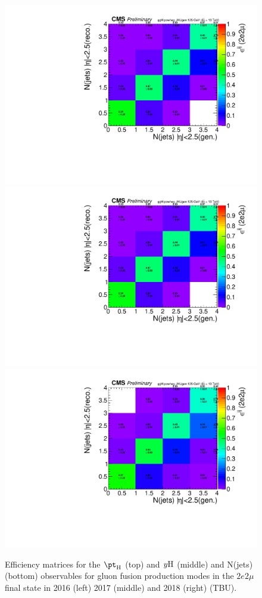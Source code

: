 \begin{figure}[!h]
       \includegraphics[width=0.32\linewidth]{Figures/results/fiducial/2016/eff2d_ggH_powheg_JHUgen_125_njets_pt30_eta2p5_2e2mu.pdf}
       \includegraphics[width=0.32\linewidth]{Figures/results/fiducial/2017/eff2d_ggH_powheg_JHUgen_125_njets_pt30_eta2p5_2e2mu.pdf}
       \includegraphics[width=0.32\linewidth]{Figures/results/fiducial/2018/eff2d_ggH_powheg_JHUgen_125_njets_pt30_eta2p5_2e2mu.pdf}

       \caption{Efficiency matrices for the $\pt_{\rm H}$ (top) and $y{\rm H}$ (middle) and N(jets) (bottom) observables for gluon fusion production
	       modes in the $2e2\mu$ final state in 2016 (left) 2017 (middle) and 2018 (right) (TBU). \label{fig:eff2d}}
\end{figure}

